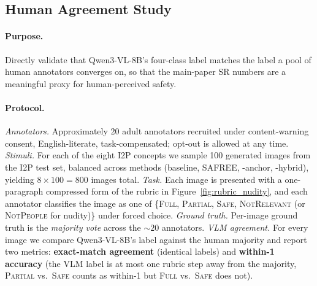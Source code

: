 \subsection{Human Agreement Study}
\label{app:human_study}

\paragraph{Purpose.}
Directly validate that Qwen3-VL-8B's four-class label matches the label a pool of human annotators converges on, so that the main-paper SR numbers are a meaningful proxy for human-perceived safety.

\paragraph{Protocol.}
\emph{Annotators.} Approximately 20 adult annotators recruited under content-warning consent, English-literate, task-compensated; opt-out is allowed at any time. \emph{Stimuli.} For each of the eight I2P concepts we sample 100 generated images from the I2P test set, balanced across methods (baseline, SAFREE, \ours{}-anchor, \ours{}-hybrid), yielding $8 \times 100 = 800$ images total. \emph{Task.} Each image is presented with a one-paragraph compressed form of the rubric in Figure~\ref{fig:rubric_nudity}, and each annotator classifies the image as one of \{\textsc{Full}, \textsc{Partial}, \textsc{Safe}, \textsc{NotRelevant} (or \textsc{NotPeople} for nudity)\} under forced choice. \emph{Ground truth.} Per-image ground truth is the \emph{majority vote} across the $\sim\!20$ annotators. \emph{VLM agreement.} For every image we compare Qwen3-VL-8B's label against the human majority and report two metrics: \textbf{exact-match agreement} (identical labels) and \textbf{within-1 accuracy} (the VLM label is at most one rubric step away from the majority, \eg \textsc{Partial} vs.\ \textsc{Safe} counts as within-1 but \textsc{Full} vs.\ \textsc{Safe} does not).

